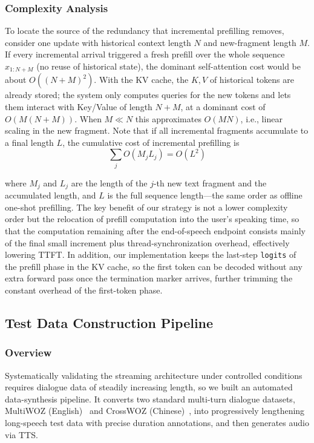 \documentclass[pdflatex,iicol,Numbered,sn-basic]{sn-jnl}%
\begin{document}
\subsubsection{Complexity Analysis}

To locate the source of the redundancy that incremental prefilling removes, consider one update with historical context length $N$ and new-fragment length $M$. If every incremental arrival triggered a fresh prefill over the whole sequence $x_{1:N+M}$ (no reuse of historical state), the dominant self-attention cost would be about $O\!\left((N+M)^{2}\right)$. With the KV cache, the $K,V$ of historical tokens are already stored; the system only computes queries for the new tokens and lets them interact with Key/Value of length $N+M$, at a dominant cost of $O\!\left(M(N+M)\right)$. When $M\ll N$ this approximates $O(MN)$, i.e., linear scaling in the new fragment. Note that if all incremental fragments accumulate to a final length $L$, the cumulative cost of incremental prefilling is
\begin{equation}
\sum_{j}O\!\left(M_j L_j\right)=O\!\left(L^{2}\right)
\label{eq:cumcost}
\end{equation}

where $M_j$ and $L_j$ are the length of the $j$-th new text fragment and the accumulated length, and $L$ is the full sequence length---the same order as offline one-shot prefilling. The key benefit of our strategy is not a lower complexity order but the relocation of prefill computation into the user's speaking time, so that the computation remaining after the end-of-speech endpoint consists mainly of the final small increment plus thread-synchronization overhead, effectively lowering TTFT. In addition, our implementation keeps the last-step \texttt{logits} of the prefill phase in the KV cache, so the first token can be decoded without any extra forward pass once the termination marker arrives, further trimming the constant overhead of the first-token phase.

\subsection{Test Data Construction Pipeline}\label{sec:data}

\subsubsection{Overview}

Systematically validating the streaming architecture under controlled conditions requires dialogue data of steadily increasing length, so we built an automated data-synthesis pipeline. It converts two standard multi-turn dialogue datasets, MultiWOZ (English)~\cite{ref14} and CrossWOZ (Chinese)~\cite{ref15}, into progressively lengthening long-speech test data with precise duration annotations, and then generates audio via TTS.
\end{document}
